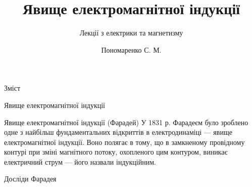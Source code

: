 \documentclass[onlytextwidth]{beamer}
\title[Лекції електрики та магнетизму]{\huge\bfseries Явище електромагнітної індукції}
\subtitle{Лекції з електрики та магнетизму}
\author{Пономаренко С. М.}
\date{}
\begin{document}
\begin{frame}[plain]
	\maketitle
\end{frame}

\begin{frame}{Зміст}{}
	\tableofcontents
\end{frame}

\begin{frame}{Явище електромагнітної індукції}{}
\begin{block}{Явище електромагнітної індукції (Фарадей)}\justifying
У 1831 р. Фарадеєм було зроблено одне з найбільш фундаментальних відкриттів в електродинаміці --- \alert{явище електромагнітної індукції}. Воно
полягає в тому, що в замкненому провідному контурі при зміні магнітного потоку, охопленого цим контуром, виникає електричний струм --- його назвали
індукційним.
\end{block}
\end{frame}



\begin{frame}{Досліди Фарадея}{}

\end{frame}
\end{document}
